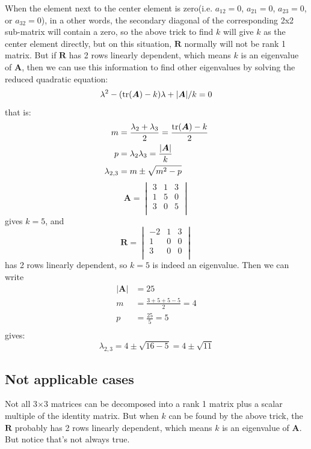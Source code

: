 \documentclass{article}
\begin{document}
When the element next to the center element is zero(i.e.
\( a_{12} = 0 \), \( a_{21} = 0 \), \( a_{23} = 0 \), or \( a_{32} = 0 \)),
in a other words, the secondary diagonal of the corresponding 2x2 sub-matrix
will contain a zero, so the above trick to find \( k \) will give $k$ as the
center element directly, but on this situation, $\boldsymbol R$ normally will not
be rank 1 matrix. But if $\boldsymbol{R}$ has 2 rows linearly dependent, which
means $k$ is an eigenvalue of $\boldsymbol{A}$, then we can use this information
to find other eigenvalues by solving the reduced quadratic equation:
\[
	\lambda^2 - (\operatorname{tr}(\boldsymbol A) - k)\lambda + |\boldsymbol A|/k = 0
\]
that is:
\[
\begin{aligned}
	m &= \frac{\lambda_2+\lambda_3}{2} = \frac{\operatorname{tr}(\boldsymbol A) - k}{2}\\
	p &= \lambda_2 \lambda_3 = \frac{|\boldsymbol A|}{k}\\
	\lambda_{2,3} &= m \pm \sqrt{m^2 - p}\\
\end{aligned}
\] 
\[
	\boldsymbol{A}=
\begin{vmatrix}
	3 & 1 & 3 \\
	1 & 5 & 0 \\
	3 & 0 & 5 \\
\end{vmatrix}
\] 
gives \( k = 5 \), and
\[
\boldsymbol{R}=
\begin{vmatrix}
	-2 & 1 & 3 \\
	1 & 0 & 0 \\
	3 & 0 & 0 \\
\end{vmatrix}
\] 
has 2 rows linearly dependent, so $k=5$ is indeed an eigenvalue.
Then we can write
\[
	\begin{aligned}
		|\boldsymbol{A}|&=25 \\
		m &= \frac{3+5+5-5}{2} = 4\\
		p &= \frac{25}{5} = 5\\
	\end{aligned}
\] 
gives:
\[
	\lambda_{2,3} = 4 \pm \sqrt{16 - 5} = 4 \pm \sqrt{11}
\] 

\subsection{Not applicable cases}

Not all 3$\times$3 matrices can be decomposed into a rank 1 matrix plus a scalar multiple of the identity matrix. But when $k$ can be found by the above trick, the $\boldsymbol R$ probably has 2 rows linearly dependent, which means $k$ is an eigenvalue of $\boldsymbol A$. But notice that's not always true.
\end{document}
